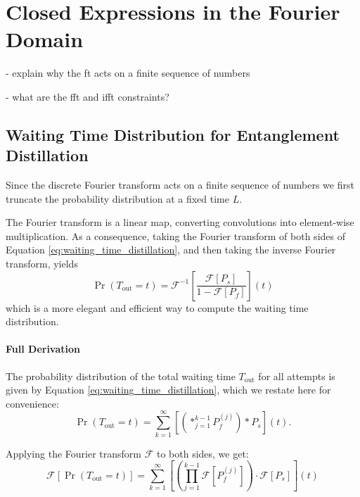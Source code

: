 \documentclass{masterthesis}
\begin{document}
\section*{Closed Expressions in the Fourier Domain}



- explain why the ft acts on a finite sequence of numbers

- what are the fft and ifft constraints?


\subsection*{Waiting Time Distribution for Entanglement Distillation}

Since the discrete Fourier transform acts on a finite sequence of numbers we first truncate the probability distribution at a fixed time $L$.

The Fourier transform is a linear map, converting convolutions into element-wise multiplication. As a consequence, taking the Fourier transform of both sides of Equation \ref{eq:waiting_time_distillation}, and then taking the inverse Fourier transform, yields
\begin{equation}\label{eq:waiting_time_distillation_fourier}
    \Pr(T_{\text{out}} = t) = \mathcal{F}^{-1} \left[ \frac{\mathcal{F}[P_s]}{1 - \mathcal{F}[P_f]} \right](t)
\end{equation}
which is a more elegant and efficient way to compute the waiting time distribution.

\paragraph*{Full Derivation}

The probability distribution of the total waiting time \( T_{\text{out}} \) for all attempts is given by Equation \ref{eq:waiting_time_distillation}, which we restate here for convenience:
\begin{equation}
    \Pr(T_{\text{out}} = t) = \sum_{k=1}^{\infty} \left[ \left(\ast_{j=1}^{k-1} P_f^{(j)} \right) \ast P_s \right](t) .
\end{equation}

Applying the Fourier transform \(\mathcal{F}\) to both sides, we get:
\begin{equation}
    \mathcal{F}[\Pr(T_{\text{out}} = t)] = \sum_{k=1}^{\infty} \left[ \left(\prod_{j=1}^{k-1} \mathcal{F}[P_f^{(j)}] \right) \cdot \mathcal{F}[P_s] \right](t)
\end{equation}
\end{document}
